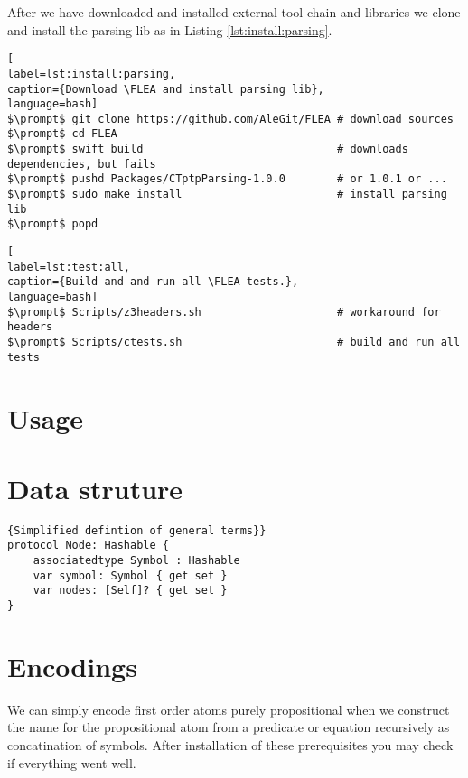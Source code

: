 After we have downloaded and installed external tool chain and libraries we clone \FLEA and install the parsing lib as in Listing \ref{lst:install:parsing}.

\begin{lstlisting}[
label=lst:install:parsing,
caption={Download \FLEA and install parsing lib},
language=bash]
$\prompt$ git clone https://github.com/AleGit/FLEA # download sources
$\prompt$ cd FLEA
$\prompt$ swift build                              # downloads dependencies, but fails
$\prompt$ pushd Packages/CTptpParsing-1.0.0        # or 1.0.1 or ...
$\prompt$ sudo make install                        # install parsing lib
$\prompt$ popd
\end{lstlisting}

\begin{lstlisting}[
label=lst:test:all,
caption={Build and and run all \FLEA tests.},
language=bash]
$\prompt$ Scripts/z3headers.sh                     # workaround for headers
$\prompt$ Scripts/ctests.sh                        # build and run all tests
\end{lstlisting}



\section{Usage}

\section{Data struture}

\begin{lstlisting}[language=flea]{Simplified defintion of general terms}}
protocol Node: Hashable {
	associatedtype Symbol : Hashable
	var symbol: Symbol { get set }
	var nodes: [Self]? { get set }
}
\end{lstlisting}

\section{Encodings}


We can simply encode first order atoms purely propositional 
when we construct the name for the propositional atom 
from a predicate or equation recursively as concatination of symbols.
After installation of these prerequisites you may check if everything went well.



